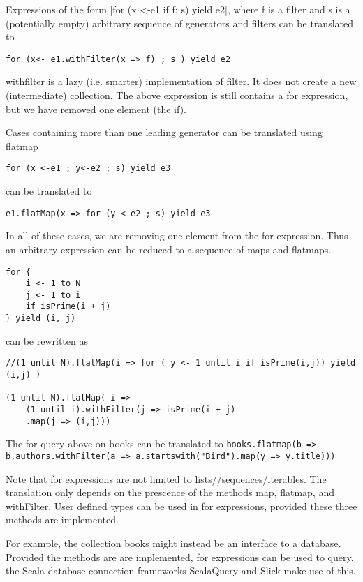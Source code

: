Expressions of the form \lstlinline|for (x <-e1 if f; s) yield e2|, where f is a filter and s is a (potentially empty) arbitrary sequence of generators and filters can be translated to 
\begin{lstlisting}
for (x<- e1.withFilter(x => f) ; s ) yield e2
\end{lstlisting}
withfilter is a lazy (i.e. smarter) implementation of filter. It does not create a new (intermediate) collection. The above expression is still contains a for expression, but we have removed one element (the if).

Cases containing more than one leading generator can be translated using flatmap
\begin{lstlisting}
for (x <-e1 ; y<-e2 ; s) yield e3
\end{lstlisting}
can be translated to 
\begin{lstlisting}
e1.flatMap(x => for (y <-e2 ; s) yield e3
\end{lstlisting}

In all of these cases, we are removing one element from the for expression. Thus an arbitrary expression can be reduced to a sequence of maps and flatmaps.

\begin{lstlisting}
for { 
	i <- 1 to N
	j <- 1 to i
	if isPrime(i + j)
} yield (i, j)
\end{lstlisting}

can be rewritten as
\begin{lstlisting}
//(1 until N).flatMap(i => for ( y <- 1 until i if isPrime(i,j)) yield (i,j) )

(1 until N).flatMap( i => 
	(1 until i).withFilter(j => isPrime(i + j)
	.map(j => (i,j)))
\end{lstlisting}

The for query above on books can be translated to \lstinline|books.flatmap(b => b.authors.withFilter(a => a.startswith("Bird").map(y => y.title)))|

Note that for expressions are not limited to lists//sequences/iterables. The translation only depends on the prescence of the methods map, flatmap, and withFilter. User defined types can be used in for expressions, provided these three methods are implemented.

For example, the collection books might instead be an interface to a database. Provided the methods are are implemented, for expressions can be used to query. the Scala database connection frameworks ScalaQuery and Slick make use of this.



